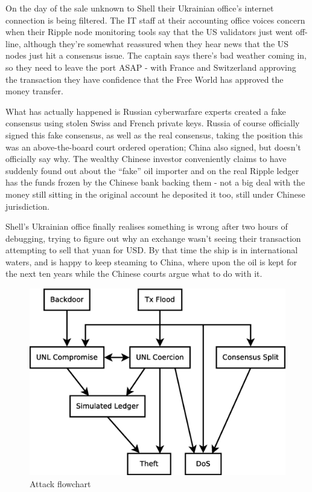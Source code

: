\documentclass{article}
\begin{document}
On the day of the sale unknown to Shell their Ukrainian office's internet
connection is being filtered. The IT staff at their accounting office voices
concern when their Ripple node monitoring tools say that the US validators just
went off-line, although they're somewhat reassured when they hear news that the
US nodes just hit a consensus issue. The captain says there's bad weather
coming in, so they need to leave the port ASAP - with France and Switzerland
approving the transaction they have confidence that the Free World has approved
the money transfer.

What has actually happened is Russian cyberwarfare experts created a fake
consensus using stolen Swiss and French private keys. Russia of course
officially signed this fake consensus, as well as the real consensus, taking
the position this was an above-the-board court ordered operation; China also
signed, but doesn't officially say why. The wealthy Chinese investor
conveniently claims to have suddenly found out about the ``fake'' oil importer
and on the real Ripple ledger has the funds frozen by the Chinese bank backing
them - not a big deal with the money still sitting in the original account he
deposited it too, still under Chinese jurisdiction.

Shell's Ukrainian office finally realises something is wrong after two hours of
debugging, trying to figure out why an exchange wasn't seeing their transaction
attempting to sell that yuan for USD. By that time the ship is in international
waters, and is happy to keep steaming to China, where upon the oil is kept for
the next ten years while the Chinese courts argue what to do with it.

\begin{figure}
    \centering
    \includegraphics[scale=0.5]{figures/attack-flowchart.eps}
    \caption{Attack flowchart}
    \label{fig:attack-flowchart}
\end{figure}
\end{document}
